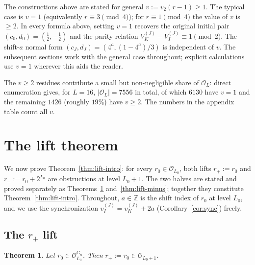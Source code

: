 \documentclass[11pt,reqno]{amsart}
\theoremstyle{plain}
\newtheorem{theorem}{Theorem}[section]
\theoremstyle{definition}
\theoremstyle{remark}
\newcommand{\Z}{\mathbb{Z}}
\newcommand{\Obs}{\mathcal{O}}
\newcommand{\Vk}{V_{K}}
\newcommand{\Vi}{V_{I}}
\newcommand{\vk}{v_{K}}
\newcommand{\vi}{v_{I}}
\newcommand{\vtwo}{v_{2}}
\begin{document}
The constructions above are stated for general $v := \vtwo(r-1) \ge 1$. The
typical case is $v = 1$ (equivalently $r \equiv 3 \pmod 4$); for $r \equiv 1
\pmod 4$ the value of $v$ is $\ge 2$. In every formula above, setting $v = 1$
recovers the original initial pair $(c_0, d_0) = (\tfrac{1}{2}, -\tfrac{1}{2})$
and the parity relation $\Vk^{(J)} - \Vi^{(J)} \equiv 1 \pmod 2$. The
shift-$a$ normal form $(c_J, d_J) = (4^a, (1-4^a)/3)$ is independent of $v$.
The subsequent sections work with the general case throughout; explicit
calculations use $v = 1$ wherever this aids the reader.

The $v \ge 2$ residues contribute a small but non-negligible share of
$\Obs_L$: direct enumeration gives, for $L = 16$, $|\Obs_L| = 7556$ in
total, of which $6130$ have $v = 1$ and the remaining $1426$ (roughly
$19\%$) have $v \ge 2$. The numbers in the appendix table count all $v$.

\section{The lift theorem}
\label{sec:lift}

We now prove Theorem~\ref{thm:lift-intro}: for every $r_0 \in \Obs_{L_0}$,
both lifts $r_+ := r_0$ and $r_- := r_0 + 2^{L_0}$ are obstructions at level
$L_0 + 1$. The two halves are stated and proved separately as
Theorems~\ref{thm:lift-plus} and~\ref{thm:lift-minus}; together they
constitute Theorem~\ref{thm:lift-intro}. Throughout, $a \in \Z$ is the
shift index of $r_0$ at level $L_0$, and we use the synchronization
$\vi^{(J)} = \vk^{(J)} + 2a$ (Corollary~\ref{cor:sync}) freely.

\subsection{The \texorpdfstring{$r_+$}{r+} lift}

\begin{theorem}\label{thm:lift-plus}
Let $r_0 \in \Obs_{L_0}^{G_a}$. Then $r_+ := r_0 \in \Obs_{L_0+1}$.
\end{theorem}
\end{document}
